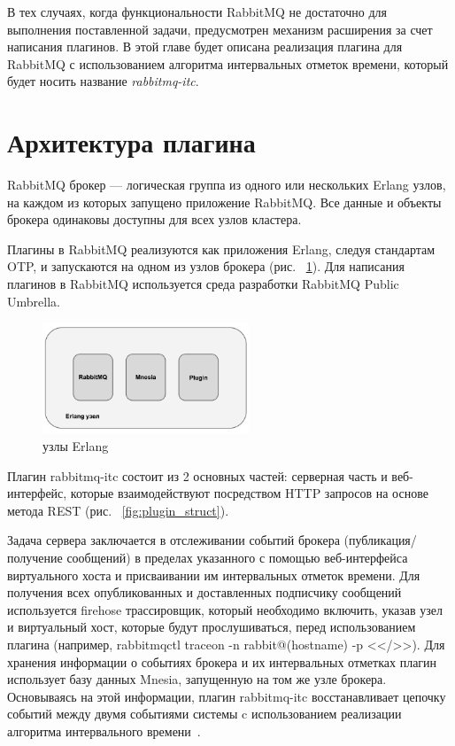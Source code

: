 В тех случаях, когда функциональности RabbitMQ не достаточно для выполнения поставленной задачи, предусмотрен механизм расширения за счет написания плагинов. В этой главе будет описана реализация плагина для RabbitMQ с использованием алгоритма интервальных отметок времени, который будет носить название \textit{rabbitmq-itc}.

\section{Архитектура плагина}
RabbitMQ брокер --- логическая группа из одного или нескольких Erlang узлов, на каждом из которых запущено приложение RabbitMQ. Все данные и объекты брокера одинаковы доступны для всех узлов кластера.

Плагины в RabbitMQ реализуются как приложения Erlang, следуя стандартам OTP, и запускаются на одном из узлов брокера (рис. ~\ref{fig:node}). Для написания плагинов в RabbitMQ используется среда разработки RabbitMQ Public Umbrella.

\begin{figure}
\centering
\includegraphics[width=0.55\textwidth]{img/node.png}
\caption{узлы Erlang}
\label{fig:node}
\end{figure}
Плагин rabbitmq-itc состоит из 2 основных частей: серверная часть и веб-интерфейс, которые взаимодействуют посредством HTTP запросов на основе метода REST (рис. ~\ref{fig:plugin_struct}).

Задача сервера заключается в отслеживании событий брокера (публикация/получение сообщений) в пределах указанного с помощью веб-интерфейса  виртуального хоста и присваивании им интервальных отметок времени. Для получения всех опубликованных и доставленных подписчику сообщений используется  firehose трассировщик, который необходимо включить, указав узел и виртуальный хост, которые будут прослушиваться, перед использованием плагина (например, rabbitmqctl trace\underline{\hspace{0.25cm}}on -n rabbit@(hostname) -p <</>>). Для хранения информации о событиях брокера и их интервальных отметках плагин использует базу данных Mnesia, запущенную на том же узле брокера. Основываясь на этой информации, плагин rabbitmq-itc восстанавливает цепочку событий между двумя событиями системы c использованием реализации алгоритма интервального времени~\cite{itc}.

